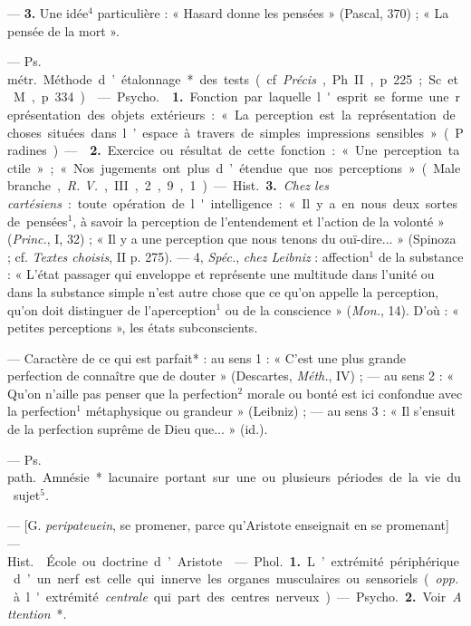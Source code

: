 \begin{itemize}[leftmargin=1cm, label=, itemsep=1pt]
—  {\bf 3.} Une idée$^4$ particulière : « Hasard donne les
pensées » (Pascal, 370) ; « La pensée de la mort ».

 — \si{Ps. métr.} Méthode d’étalonnage* des tests (cf.
{\it Précis}, Ph. II, p. 225; Sc. et M., p. 334).

 — \si{Psycho.}  {\bf 1.} Fonction par laquelle
l'esprit se forme une représentation des objets extérieurs : « La perception
est la représentation de choses situées dans l’espace à travers de simples
impressions sensibles » (Pradines). —  {\bf 2.} Exercice ou
résultat de cette fonction : « Une perception tactile »; « Nos jugements
ont plus d’étendue que nos perceptions » (Malebranche, {\it R. V.}, III, 2,
9, 1).

— \si{Hist.} {\bf 3.} {\it Chez les cartésiens} : toute opération de
l'intelligence : « Il y a en nous deux sortes de pensées$^1$, à savoir la
perception de l’entendement et l’action de la volonté » ({\it Princ.}, I,
32) ; « Il y a une perception que nous tenons du ouï-dire... » (Spinoza ; cf.
{\it Textes choisis}, II p. 275). — 4, {\it Spéc.}, {\it chez Leibniz} :
affection$^1$ de la substance : « L'état passager qui enveloppe et représente
une multitude dans l’unité ou dans la substance simple n’est autre chose que
ce qu’on appelle la perception, qu’on doit distinguer de l’aperception$^1$ ou
de la conscience » ({\it Mon.}, 14). D'où : « petites perceptions », les
états subconscients.

 — Caractère de ce qui est parfait* : au sens 1 : « C’est une
plus grande perfection de connaître que de douter » (Descartes, {\it Méth.},
IV) ; — au sens 2 : « Qu'on n'aille pas penser que la perfection$^2$ morale
ou bonté est ici confondue avec la perfection$^1$ métaphysique ou grandeur
» (Leibniz) ; — au sens 3 : « Il s'ensuit de la perfection suprême de Dieu
que... » (id.).

 — \si{Ps. path.} Amnésie* lacunaire portant sur une
ou plusieurs périodes de la vie du sujet$^5$.

 — [G. {\it peripateuein}, se promener, parce qu’Aristote
enseignait en se promenant] — \si{Hist.}  École ou doctrine
d’Aristote.

 — \si{Phol.} {\bf 1.} L’extrémité périphérique d’un nerf
est celle qui innerve les organes musculaires ou sensoriels ({\it opp.} à
l'extrémité {\it centrale} qui part des centres nerveux). — \si{Psycho.}
{\bf 2.} Voir {\it Attention}*.


\end{itemize}
